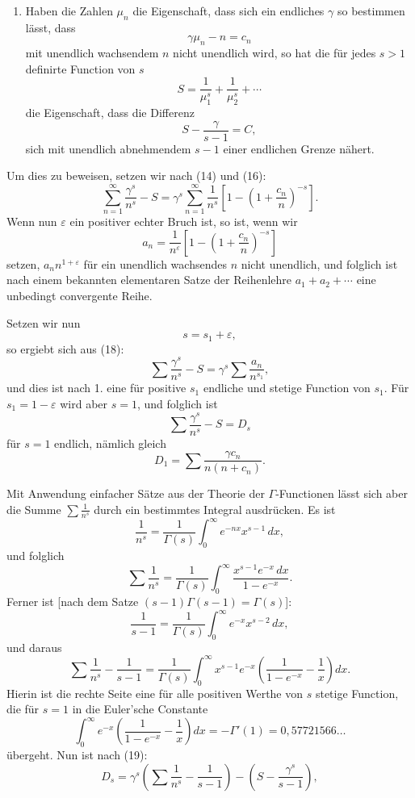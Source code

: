 \documentclass[11pt]{article}
\begin{document}
\begin{enumerate}[label=\textbf{\arabic*.},leftmargin=2.2em,start=6]
\item Haben die Zahlen $\mu_n$ die Eigenschaft, dass sich ein endliches $\gamma$ so bestimmen lässt, dass
\begin{equation}
\gamma\mu_n-n=c_n
\tag{15}
\end{equation}
mit unendlich wachsendem $n$ nicht unendlich wird, so hat die für jedes $s>1$ definirte Function von $s$
\begin{equation}
S=\frac1{\mu_1^s}+\frac1{\mu_2^s}+\cdots
\tag{16}
\end{equation}
die Eigenschaft, dass die Differenz
\begin{equation}
S-\frac{\gamma}{s-1}=C,
\tag{17}
\end{equation}
sich mit unendlich abnehmendem $s-1$ einer endlichen Grenze nähert.
\end{enumerate}

Um dies zu beweisen, setzen wir nach (14) und (16):
\begin{equation}
\sum_{n=1}^{\infty}\frac{\gamma^s}{n^s}-S
=\gamma^s\sum_{n=1}^{\infty}\frac1{n^s}
\left[1-\left(1+\frac{c_n}{n}\right)^{-s}\right].
\tag{18}
\end{equation}
Wenn nun $\varepsilon$ ein positiver echter Bruch ist, so ist, wenn wir
\[
a_n=\frac1{n^\varepsilon}\left[1-\left(1+\frac{c_n}{n}\right)^{-s}\right]
\]
setzen, $a_n n^{1+\varepsilon}$ für ein unendlich wachsendes $n$ nicht unendlich, und folglich ist nach einem bekannten elementaren Satze der Reihenlehre $a_1+a_2+\cdots$ eine unbedingt convergente Reihe.

Setzen wir nun
\[
s=s_1+\varepsilon,
\]
so ergiebt sich aus (18):
\[
\sum\frac{\gamma^s}{n^s}-S=\gamma^s\sum\frac{a_n}{n^{s_1}},
\]
und dies ist nach 1. eine für positive $s_1$ endliche und stetige Function von $s_1$. Für $s_1=1-\varepsilon$ wird aber $s=1$, und folglich ist
\begin{equation}
\sum\frac{\gamma^s}{n^s}-S=D_s
\tag{19}
\end{equation}
für $s=1$ endlich, nämlich gleich
\[
D_1=\sum\frac{\gamma c_n}{n(n+c_n)}.
\]

Mit Anwendung einfacher Sätze aus der Theorie der $\Gamma$-Functionen lässt sich aber die Summe $\sum\frac1{n^s}$ durch ein bestimmtes Integral ausdrücken. Es ist
\[
\frac1{n^s}=\frac1{\Gamma(s)}\int_0^\infty e^{-nx}x^{s-1}\,dx,
\]
und folglich
\[
\sum\frac1{n^s}=\frac1{\Gamma(s)}\int_0^\infty \frac{x^{s-1}e^{-x}\,dx}{1-e^{-x}}.
\]
Ferner ist [nach dem Satze $(s-1)\Gamma(s-1)=\Gamma(s)$]:
\[
\frac1{s-1}=\frac1{\Gamma(s)}\int_0^\infty e^{-x}x^{s-2}\,dx,
\]
und daraus
\[
\sum\frac1{n^s}-\frac1{s-1}
=\frac1{\Gamma(s)}\int_0^\infty x^{s-1}e^{-x}
\left(\frac1{1-e^{-x}}-\frac1x\right)dx.
\]
Hierin ist die rechte Seite eine für alle positiven Werthe von $s$ stetige Function, die für $s=1$ in die Euler'sche Constante
\[
\int_0^\infty e^{-x}\left(\frac1{1-e^{-x}}-\frac1x\right)dx
=-\Gamma'(1)=0{,}57721566\ldots
\]
übergeht. Nun ist nach (19):
\[
D_s=\gamma^s\left(\sum\frac1{n^s}-\frac1{s-1}\right)
-\left(S-\frac{\gamma^s}{s-1}\right),
\]
\end{document}
